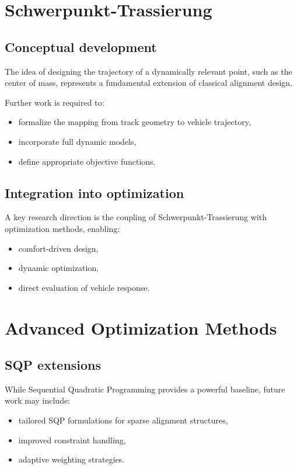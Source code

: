 \section{Schwerpunkt-Trassierung}

\subsection{Conceptual development}

The idea of designing the trajectory of a dynamically relevant point,
such as the center of mass, represents a fundamental extension of
classical alignment design.

Further work is required to:
\begin{itemize}
\item formalize the mapping from track geometry to vehicle trajectory,
\item incorporate full dynamic models,
\item define appropriate objective functions.
\end{itemize}

\subsection{Integration into optimization}

A key research direction is the coupling of Schwerpunkt-Trassierung with
optimization methods, enabling:
\begin{itemize}
\item comfort-driven design,
\item dynamic optimization,
\item direct evaluation of vehicle response.
\end{itemize}


\section{Advanced Optimization Methods}

\subsection{SQP extensions}

While Sequential Quadratic Programming provides a powerful baseline,
future work may include:
\begin{itemize}
\item tailored SQP formulations for sparse alignment structures,
\item improved constraint handling,
\item adaptive weighting strategies.
\end{itemize}

